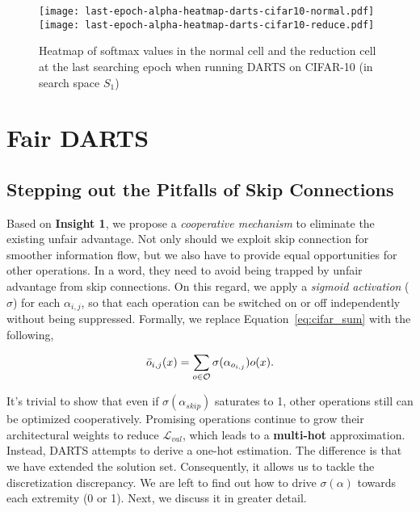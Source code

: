 \documentclass[runningheads]{llncs}
\begin{document}
\begin{figure}[ht]
	\centering
	\texttt{[image: last-epoch-alpha-heatmap-darts-cifar10-normal.pdf]}
	\texttt{[image: last-epoch-alpha-heatmap-darts-cifar10-reduce.pdf]}
\caption{Heatmap of softmax values in the normal cell and the reduction cell at the last searching epoch when running DARTS on CIFAR-10 (in search space $S_1$)}
	\label{fig:alpha-heatmap-darts-cifar-imagenet}
\end{figure}





 

















\section{Fair DARTS}
\subsection{Stepping out the Pitfalls of Skip Connections}

Based on \textbf{Insight 1}, we propose a \emph{cooperative mechanism} to eliminate the existing unfair advantage. Not only should we exploit skip connection for smoother information flow, but we also have to provide equal opportunities for other operations. In a word, they need to avoid being trapped by unfair advantage from skip connections. On this regard, we apply a \emph{sigmoid activation} ($\sigma$) for each $\alpha_{i,j}$, so that each operation can be switched on or off independently without being suppressed. Formally, we replace Equation~\ref{eq:cifar_sum} with the following,

\begin{align}{\label{eq:fairsum}}
\bar{o}_{i, j} (x) = \sum_{o \in \mathcal{O}} \sigma(\alpha_{o_{i,j}})  o(x).
\end{align}

It's trivial to show that even if $\sigma(\alpha_{skip})$ saturates to 1, other operations still can be optimized cooperatively. Promising operations continue to grow their architectural weights to reduce $\mathcal{L}_{val}$, which leads to a \textbf{multi-hot} approximation. Instead, DARTS attempts to derive a one-hot estimation. The difference is that we have extended the solution set. Consequently, it allows us to tackle the discretization discrepancy. We are left to find out how to drive $\sigma(\alpha)$ towards each extremity (0 or 1). Next, we discuss it in greater detail.
\end{document}
